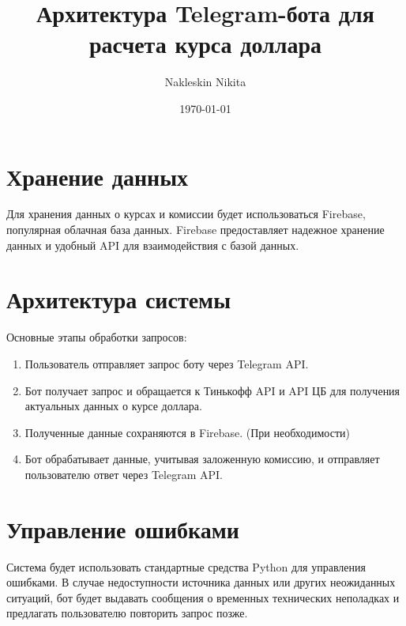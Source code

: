 \documentclass{article}
\begin{document}
\title{Архитектура Telegram-бота для расчета курса доллара}
\author{Nakleskin Nikita}

\date{\today}
\maketitle

\section{Хранение данных}
Для хранения данных о курсах и комиссии будет использоваться Firebase, популярная облачная база данных. Firebase предоставляет надежное хранение данных и удобный API для взаимодействия с базой данных.

\section{Архитектура системы}
\begin{center}
\end{center}

Основные этапы обработки запросов:
\begin{enumerate}
  \item Пользователь отправляет запрос боту через Telegram API.
  \item Бот получает запрос и обращается к Тинькофф API и API ЦБ для получения актуальных данных о курсе доллара.
  \item Полученные данные сохраняются в Firebase. (При необходимости)
  \item Бот обрабатывает данные, учитывая заложенную комиссию, и отправляет пользователю ответ через Telegram API.
\end{enumerate}

\section{Управление ошибками}
Система будет использовать стандартные средства Python для управления ошибками. В случае недоступности источника данных или других неожиданных ситуаций, бот будет выдавать сообщения о временных технических неполадках и предлагать пользователю повторить запрос позже.
\end{document}
